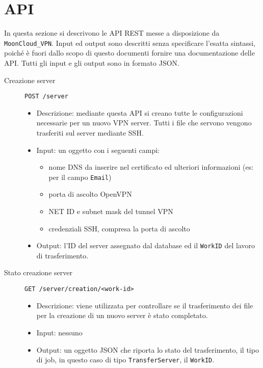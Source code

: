 \section{API}
In questa sezione si descrivono le API REST messe a disposizione da \texttt{MoonCloud\_VPN}.
Input ed output sono descritti senza specificare l'esatta sintassi, poiché è fuori dallo scopo
di questo documenti fornire una documentazione delle API. Tutti gli input e gli
output sono in formato JSON.

\begin{description}
    \item[Creazione server]\texttt{POST /server}
    \begin{itemize}
        \item Descrizione: mediante questa API si creano tutte le configurazioni necessarie per
        un nuovo VPN server. Tutti i file che servono vengono trasferiti sul server mediante
        SSH.
        \item Input: un oggetto con i seguenti campi:
        \begin{itemize}
            \item nome DNS da inserire nel certificato ed ulteriori informazioni (es: per il campo \texttt{Email})
            \item porta di ascolto OpenVPN
            \item NET ID e subnet mask del tunnel VPN
            \item credenziali SSH, compresa la porta di ascolto 
        \end{itemize}
        \item Output: l'ID del server assegnato dal database ed il \texttt{WorkID} del lavoro di
        trasferimento.
    \end{itemize}

    \item[Stato creazione server]\texttt{GET /server/creation/<work-id>}
    \begin{itemize}
        \item Descrizione: viene utilizzata per controllare se il trasferimento dei file
        per la creazione di un nuovo server è stato completato.
        \item Input: nessuno
        \item Output: un oggetto JSON che riporta lo stato del trasferimento, il tipo di job,
        in questo caso di tipo \texttt{TransferServer}, il \texttt{WorkID}.
    \end{itemize}


\end{description}
